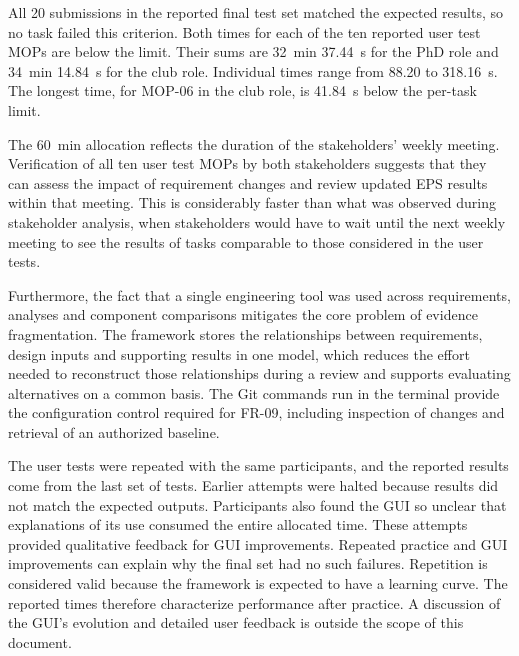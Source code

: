 \begin{table}
\centering
\caption[First user test task.]{First user test task. Screenshots show the shared initial state and the student club member's submission. Times are in seconds.}
\label{tab:user-trial-first-task}
\begin{UserTrialEvidence}
\UserTrialFirstRow
\end{UserTrialEvidence}
\end{table}


All 20 submissions in the reported final test set matched the expected results, so no task failed this criterion.
Both times for each of the ten reported user test MOPs are below the limit.
Their sums are 32~min 37.44~s for the PhD role and 34~min 14.84~s for the club role.
Individual times range from 88.20 to 318.16~s.
The longest time, for MOP-06 in the club role, is 41.84~s below the per-task limit.

The 60~min allocation reflects the duration of the stakeholders' weekly meeting.
Verification of all ten user test MOPs by both stakeholders suggests that they can assess the impact of requirement changes and review updated EPS results within that meeting.
This is considerably faster than what was observed during stakeholder analysis, when stakeholders would have to wait until the next weekly meeting to see the results of tasks comparable to those considered in the user tests.

Furthermore, the fact that a single engineering tool was used across requirements, analyses and component comparisons mitigates the core problem of evidence fragmentation.
The framework stores the relationships between requirements, design inputs and supporting results in one model, which reduces the effort needed to reconstruct those relationships during a review and supports evaluating alternatives on a common basis.
The Git commands run in the terminal provide the configuration control required for FR-09, including inspection of changes and retrieval of an authorized baseline.

The user tests were repeated with the same participants, and the reported results come from the last set of tests.
Earlier attempts were halted because results did not match the expected outputs.
Participants also found the GUI so unclear that explanations of its use consumed the entire allocated time.
These attempts provided qualitative feedback for GUI improvements.
Repeated practice and GUI improvements can explain why the final set had no such failures.
Repetition is considered valid because the framework is expected to have a learning curve.
The reported times therefore characterize performance after practice.
A discussion of the GUI's evolution and detailed user feedback is outside the scope of this document.

